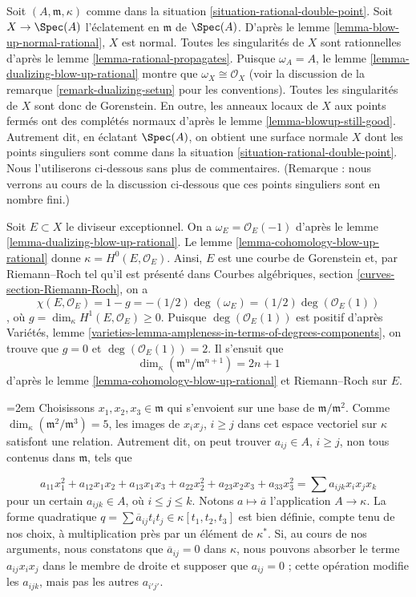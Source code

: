\noindent Soit $(A, \mathfrak m, \kappa)$ comme dans la situation \ref{situation-rational-double-point}. Soit $X \to \Spec(A)$ l'éclatement en $\mathfrak m$ de $\Spec(A)$. D'après le lemme \ref{lemma-blow-up-normal-rational}, $X$ est normal. Toutes les singularités de $X$ sont rationnelles d'après le lemme \ref{lemma-rational-propagates}. Puisque $\omega_A = A$, le lemme \ref{lemma-dualizing-blow-up-rational} montre que $\omega_X \cong \mathcal{O}_X$ (voir la discussion de la remarque \ref{remark-dualizing-setup} pour les conventions). Toutes les singularités de $X$ sont donc de Gorenstein. En outre, les anneaux locaux de $X$ aux points fermés ont des complétés normaux d'après le lemme \ref{lemma-blowup-still-good}. Autrement dit, en éclatant $\Spec(A)$, on obtient une surface normale $X$ dont les points singuliers sont comme dans la situation \ref{situation-rational-double-point}. Nous l'utiliserons ci-dessous sans plus de commentaires. (Remarque : nous verrons au cours de la discussion ci-dessous que ces points singuliers sont en nombre fini.)

\medskip\noindent Soit $E \subset X$ le diviseur exceptionnel. On a $\omega_E = \mathcal{O}_E(-1)$ d'après le lemme \ref{lemma-dualizing-blow-up-rational}. Le lemme \ref{lemma-cohomology-blow-up-rational} donne $\kappa = H^0(E, \mathcal{O}_E)$. Ainsi, $E$ est une courbe de Gorenstein et, par Riemann--Roch tel qu'il est présenté dans Courbes algébriques, section \ref{curves-section-Riemann-Roch}, on a $$
\chi(E, \mathcal{O}_E) = 1 - g = -(1/2) \deg(\omega_E) =
(1/2)\deg(\mathcal{O}_E(1))
$$, où $g = \dim_\kappa H^1(E, \mathcal{O}_E) \geq 0$. Puisque $\deg(\mathcal{O}_E(1))$ est positif d'après Variétés, lemme \ref{varieties-lemma-ampleness-in-terms-of-degrees-components}, on trouve que $g = 0$ et $\deg(\mathcal{O}_E(1)) = 2$. Il s'ensuit que $$
\dim_\kappa (\mathfrak m^n/\mathfrak m^{n + 1}) = 2n + 1
$$ d'après le lemme \ref{lemma-cohomology-blow-up-rational} et Riemann--Roch sur $E$.

\medskip\noindent \begingroup\emergencystretch=2em
Choisissons $x_1, x_2, x_3 \in \mathfrak m$ qui s'envoient sur une base de $\mathfrak m/\mathfrak m^2$. Comme $\dim_\kappa(\mathfrak m^2/\mathfrak m^3) = 5$, les images de $x_i x_j$, $i \geq j$ dans cet espace vectoriel sur $\kappa$ satisfont une relation. Autrement dit, on peut trouver $a_{ij} \in A$, $i \geq j$, non tous contenus dans $\mathfrak m$, tels que\par\endgroup
$$
a_{11} x_1^2 + a_{12} x_1x_2 + a_{13}x_1x_3 + a_{22} x_2^2 +
a_{23} x_2x_3 + a_{33} x_3^2 =
\sum a_{ijk} x_ix_jx_k
$$ pour un certain $a_{ijk} \in A$, où $i \leq j \leq k$. Notons $a \mapsto \overline{a}$ l'application $A \to \kappa$. La forme quadratique $q = \sum \overline{a}_{ij} t_i t_j \in \kappa[t_1, t_2, t_3]$ est bien définie, compte tenu de nos choix, à multiplication près par un élément de $\kappa^*$. Si, au cours de nos arguments, nous constatons que $\overline{a}_{ij} = 0$ dans $\kappa$, nous pouvons absorber le terme $a_{ij} x_i x_j$ dans le membre de droite et supposer que $a_{ij} = 0$ ; cette opération modifie les $a_{ijk}$, mais pas les autres $a_{i'j'}$.

